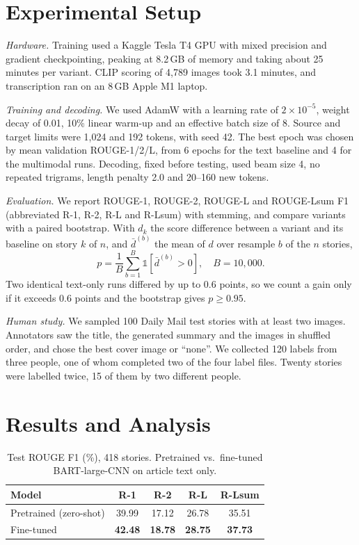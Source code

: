 \documentclass[conference]{IEEEtran}
\begin{document}
\section{Experimental Setup}
\textit{Hardware.} Training used a Kaggle Tesla T4 GPU with mixed precision and gradient checkpointing, peaking at 8.2\,GB of memory and taking about 25 minutes per variant. CLIP scoring of 4{,}789 images took 3.1 minutes, and transcription ran on an 8\,GB Apple M1 laptop.

\textit{Training and decoding.} We used AdamW with a learning rate of $2\times10^{-5}$, weight decay of 0.01, 10\% linear warm-up and an effective batch size of 8. Source and target limits were 1{,}024 and 192 tokens, with seed 42. The best epoch was chosen by mean validation ROUGE-1/2/L, from 6 epochs for the text baseline and 4 for the multimodal runs. Decoding, fixed before testing, used beam size 4, no repeated trigrams, length penalty 2.0 and 20--160 new tokens.

\textit{Evaluation.} We report ROUGE-1, ROUGE-2, ROUGE-L and ROUGE-Lsum F1 (abbreviated R-1, R-2, R-L and R-Lsum) with stemming, and compare variants with a paired bootstrap. With $d_k$ the score difference between a variant and its baseline on story $k$ of $n$, and $\bar{d}^{(b)}$ the mean of $d$ over resample $b$ of the $n$ stories,
\begin{equation}
p = \frac{1}{B}\sum_{b=1}^{B}\mathbb{1}\left[\bar{d}^{(b)}>0\right], \quad B=10{,}000.
\label{eq:boot}
\end{equation} Two identical text-only runs differed by up to 0.6 points, so we count a gain only if it exceeds 0.6 points and the bootstrap gives $p\ge0.95$.

\textit{Human study.} We sampled 100 Daily Mail test stories with at least two images. Annotators saw the title, the generated summary and the images in shuffled order, and chose the best cover image or ``none''. We collected 120 labels from three people, one of whom completed two of the four label files. Twenty stories were labelled twice, 15 of them by two different people.

\section{Results and Analysis}
\label{sec:results}

\begin{table}[t]
\caption{Test ROUGE F1 (\%), 418 stories. Pretrained vs.\ fine-tuned BART-large-CNN on article text only.}
\label{tab:text}
\centering
\begin{tabular}{lcccc}
\toprule
Model & R-1 & R-2 & R-L & R-Lsum \\
\midrule
Pretrained (zero-shot) & 39.99 & 17.12 & 26.78 & 35.51 \\
Fine-tuned             & \textbf{42.48} & \textbf{18.78} & \textbf{28.75} & \textbf{37.73} \\
\bottomrule
\end{tabular}
\end{table}
\end{document}
